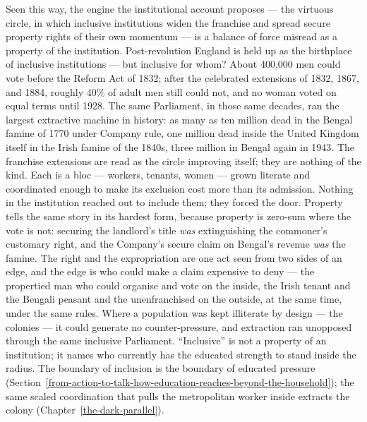 \documentclass[12pt,letterpaper]{article}
\begin{document}
Seen this way, the engine the institutional account proposes --- the virtuous circle, in which inclusive institutions widen the franchise and spread secure property rights of their own momentum --- is a balance of force misread as a property of the institution. Post-revolution England is held up as the birthplace of inclusive institutions --- but inclusive for whom? About 400{,}000 men could vote before the Reform Act of 1832; after the celebrated extensions of 1832, 1867, and 1884, roughly 40\% of adult men still could not, and no woman voted on equal terms until 1928. The same Parliament, in those same decades, ran the largest extractive machine in history: as many as ten million dead in the Bengal famine of 1770 under Company rule, one million dead inside the United Kingdom itself in the Irish famine of the 1840s, three million in Bengal again in 1943. The franchise extensions are read as the circle improving itself; they are nothing of the kind. Each is a bloc --- workers, tenants, women --- grown literate and coordinated enough to make its exclusion cost more than its admission. Nothing in the institution reached out to include them; they forced the door. Property tells the same story in its hardest form, because property is zero-sum where the vote is not: securing the landlord's title \emph{was} extinguishing the commoner's customary right, and the Company's secure claim on Bengal's revenue \emph{was} the famine. The right and the expropriation are one act seen from two sides of an edge, and the edge is who could make a claim expensive to deny --- the propertied man who could organise and vote on the inside, the Irish tenant and the Bengali peasant and the unenfranchised on the outside, at the same time, under the same rules. Where a population was kept illiterate by design --- the colonies --- it could generate no counter-pressure, and extraction ran unopposed through the same inclusive Parliament. ``Inclusive'' is not a property of an institution; it names who currently has the educated strength to stand inside the radius. The boundary of inclusion is the boundary of educated pressure (Section~\ref{from-action-to-talk-how-education-reaches-beyond-the-household}); the same scaled coordination that pulls the metropolitan worker inside extracts the colony (Chapter~\ref{the-dark-parallel}).
\end{document}
